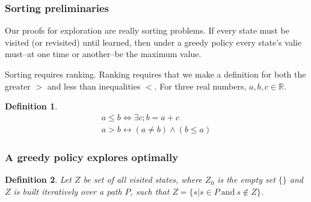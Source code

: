 \documentclass[9pt,twocolumn,twoside]{pnas-new}
\newtheorem{definition}{Definition}
\begin{document}
\subsubsection*{Sorting preliminaries}
Our proofs for exploration are really sorting problems. If every state must be visited (or revisited) until learned, then under a greedy policy every state's valie must--at one time or another--be the maximum value. 

Sorting requires ranking. Ranking requires that we make a definition for both the greater $>$ and less than inequalities $<$. For three real numbers, ${a,b,c} \in \mathbb{R}$.

\begin{definition} \label{def:ineq}
    \begin{align}
        a \leq b \Leftrightarrow \exists c; b = a + c \\
        a > b \leftrightarrow (a \neq b) \wedge (b \leq a) 
    \end{align}
\end{definition}

\subsubsection*{A greedy policy explores optimally}


\begin{definition}
    Let $Z$ be set of all visited states, where $Z_0$ is the empty set $\{\}$ and $Z$ is built iteratively over a path $P$, such that $Z = \{s | s \in P\ \text{and}\ s \not\in Z\}$.    
\end{definition}
\end{document}
